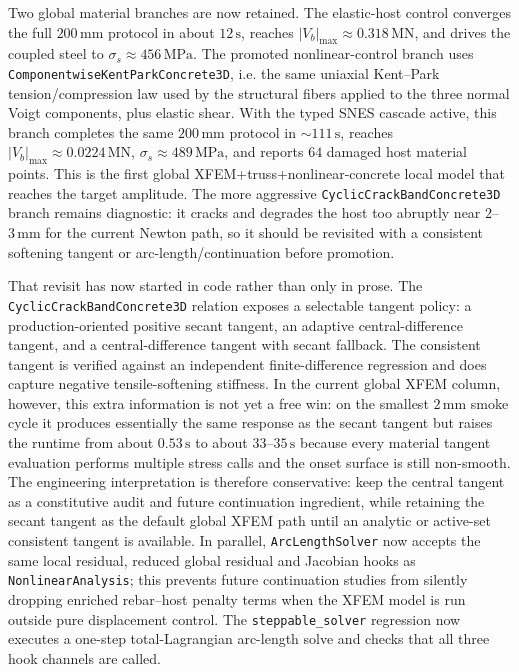 Two global material branches are now retained.  The elastic-host control
converges the full \(200\,\mathrm{mm}\) protocol in about \(12\,\mathrm{s}\),
reaches \(|V_b|_{\max}\approx0.318\,\mathrm{MN}\), and drives the coupled steel
to \(\sigma_s\approx456\,\mathrm{MPa}\).  The promoted nonlinear-control branch
uses \texttt{ComponentwiseKentParkConcrete3D}, i.e. the same uniaxial
Kent--Park tension/compression law used by the structural fibers applied to the
three normal Voigt components, plus elastic shear.  With the typed SNES
cascade active, this branch completes the same \(200\,\mathrm{mm}\) protocol in
\(\sim111\,\mathrm{s}\), reaches \(|V_b|_{\max}\approx0.0224\,\mathrm{MN}\),
\(\sigma_s\approx489\,\mathrm{MPa}\), and reports \(64\) damaged host material
points.  This is the first global XFEM+truss+nonlinear-concrete local model
that reaches the target amplitude.  The more aggressive
\texttt{CyclicCrackBandConcrete3D} branch remains diagnostic: it cracks and
degrades the host too abruptly near \(2\)--\(3\,\mathrm{mm}\) for the current
Newton path, so it should be revisited with a consistent softening tangent or
arc-length/continuation before promotion.

That revisit has now started in code rather than only in prose.  The
\texttt{CyclicCrackBandConcrete3D} relation exposes a selectable tangent policy:
a production-oriented positive secant tangent, an adaptive central-difference
tangent, and a central-difference tangent with secant fallback.  The consistent
tangent is verified against an independent finite-difference regression and
does capture negative tensile-softening stiffness.  In the current global XFEM
column, however, this extra information is not yet a free win: on the smallest
\(2\,\mathrm{mm}\) smoke cycle it produces essentially the same response as the
secant tangent but raises the runtime from about \(0.53\,\mathrm{s}\) to about
\(33\)--\(35\,\mathrm{s}\) because every material tangent evaluation performs
multiple stress calls and the onset surface is still non-smooth.  The
engineering interpretation is therefore conservative: keep the central tangent
as a constitutive audit and future continuation ingredient, while retaining the
secant tangent as the default global XFEM path until an analytic or active-set
consistent tangent is available.  In parallel, \texttt{ArcLengthSolver} now
accepts the same local residual, reduced global residual and Jacobian hooks as
\texttt{NonlinearAnalysis}; this prevents future continuation studies from
silently dropping enriched rebar--host penalty terms when the XFEM model is
run outside pure displacement control.  The \texttt{steppable\_solver}
regression now executes a one-step total-Lagrangian arc-length solve and checks
that all three hook channels are called.

